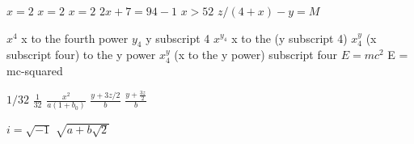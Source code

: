 \documentclass{article}
\begin{document}
$x = 2$
$x=2$ 
$ x= 2 $ 
$2x + 7 = 94 - 1$ 
$x > 52$ 
$z/(4 + x) - y = M$

$x^{4}$ x to the fourth power 
$y_{4}$ y subscript 4 
$x^{y_{4}}$ x to the (y subscript 4)
$x_{4}^{y}$ (x subscript four) to the y power 
$x^{y}_{4}$ (x to the y power) subscript four 
$E = mc^{2}$ E = mc-squared

$1/32$ 
$\frac{1}{32}$ 
$\frac{x^{2}}{a(1 + b_{0})}$
$\frac{y + 3z/2}{b}$ 
$\frac{y + \frac{3z}{2}}{b}$

$i = \sqrt{-1}$ 
$\sqrt{a + b\sqrt{2}}$
\end{document}
